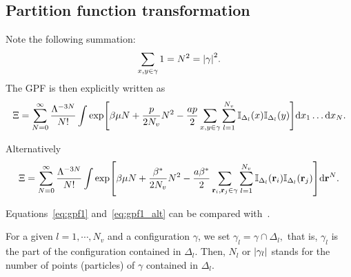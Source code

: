 \documentclass[12pt]{article}
\numberwithin{equation}{section}
\begin{document}
	\subsection{Partition function transformation}
	Note the following summation:
	\begin{equation}
		\sum_{x,y \in \gamma} 1 = N^2 = \abs{\gamma}^2.
	\end{equation}
	The GPF is then explicitly written as
	\begin{equation}
		\label{eq:gpf1}
		\Xi = \sum_{N=0}^{\infty} \frac{\Lambda^{-3N}}{N!}\int \exp[\beta\mu N + \frac{p}{2N_{v}} N^2 - \frac{ap}{2} \sum_{x,y \in \gamma} \sum_{l=1}^{N_v} \mathbb{I}_{\Delta_l}(x)\mathbb{I}_{\Delta_l}(y)] {\rm d} x_1 \dotsc {\rm d} x_N.
	\end{equation}
	
	\begin{mdframed}[linecolor=black,linewidth=1pt,leftline=true]
	Alternatively
		\begin{equation}
			\label{eq:gpf1_alt}
			\Xi = \sum_{N=0}^{\infty} \frac{\Lambda^{-3N}}{N!}
			\int 
			\exp[\beta\mu N + \frac{\beta^*}{2N_{v}} N^2 - \frac{a\beta^*}{2} \sum_{\vb{r}_i,\vb{r}_j \in \gamma} \sum_{l=1}^{N_v} \mathbb{I}_{\Delta_l}(\vb{r}_i)\mathbb{I}_{\Delta_l}(\vb{r}_j)] {\rm d} \vb{r}^N.
		\end{equation}
	\end{mdframed}
	Equations~\eqref{eq:gpf1} and~\eqref{eq:gpf1_alt} can be compared with~\cite[(2.5)]{KKD20}.
	
	For a given $l = 1, \cdots , N_v$ and a configuration $\gamma$, we set $\gamma_l = \gamma \cap \Delta_l,$ that is, $\gamma_l$ is the part of the configuration contained in $\Delta_l$. Then, $N_l$ or $\abs{\gamma_l}$ stands for the number of points (particles) of $\gamma$ contained in $\Delta_l$. 
	
\end{document}
